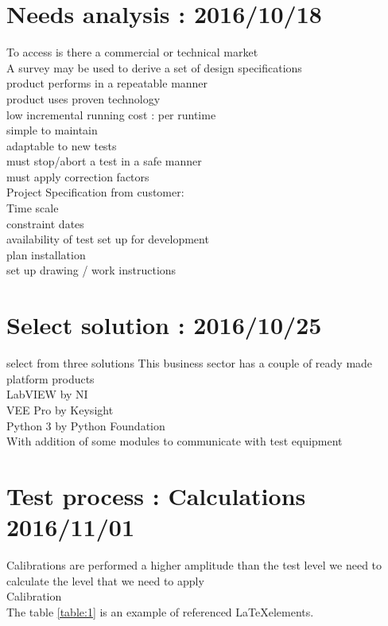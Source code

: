\documentclass[a4paper]{article}
\begin{document}
\section{Needs analysis : 2016/10/18}
To access is there a commercial or technical market\\
A survey may be used to derive a set of design specifications\\
product performs in a repeatable manner\\
product uses proven technology\\
low incremental running cost : per runtime\\
simple to maintain\\
adaptable to new tests\\
must stop/abort a test in a safe manner\\
must apply correction factors\\

Project Specification from customer:\\
Time scale\\
constraint dates\\
availability of test set up for development\\
plan installation\\
set up drawing / work instructions\\

\section{Select solution : 2016/10/25}
select from three solutions
This business sector has a couple of ready made platform products\\
LabVIEW by NI\\
VEE Pro by Keysight\\
Python 3 by Python Foundation\\
  With addition of some modules to communicate with test equipment\\

\newpage
\section{Test process : Calculations 2016/11/01}
Calibrations are performed a higher amplitude than the test level we need to calculate the level that we need to apply\\
Calibration\\
The table \ref{table:1} is an example of referenced \LaTeX elements.\\
\end{document}
